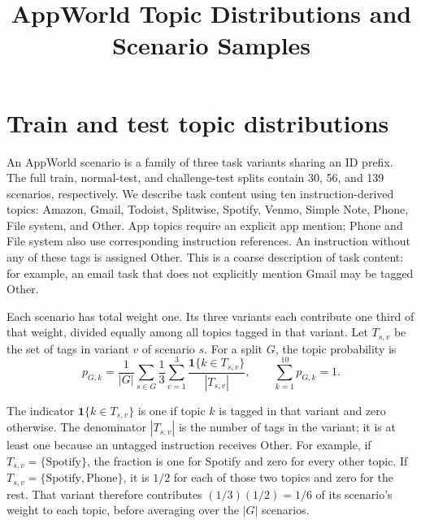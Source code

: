 \documentclass[11pt]{article}
\title{AppWorld Topic Distributions and Scenario Samples}
\author{}
\date{}
\begin{document}
\maketitle

\section{Train and test topic distributions}

An AppWorld scenario is a family of three task variants sharing an ID prefix.
The full train, normal-test, and challenge-test splits contain 30, 56, and 139
scenarios, respectively. We describe task content using ten instruction-derived
topics: Amazon, Gmail, Todoist, Splitwise, Spotify, Venmo, Simple Note, Phone,
File system, and Other. App topics require an explicit app mention; Phone and
File system also use corresponding instruction references. An instruction
without any of these tags is assigned Other. This is a coarse description of
task content: for example, an email task that does not explicitly mention
Gmail may be tagged Other.

Each scenario has total weight one. Its three variants each contribute one
third of that weight, divided equally among all topics tagged in that
variant. Let \(T_{s,v}\) be the set of tags in variant \(v\) of scenario \(s\).
For a split \(G\), the topic probability is
\begin{equation}
  p_{G,k}
  = \frac{1}{|G|}
    \sum_{s\in G}\frac{1}{3}
    \sum_{v=1}^{3}
    \frac{\mathbf{1}\{k\in T_{s,v}\}}{|T_{s,v}|},
  \qquad
  \sum_{k=1}^{10}p_{G,k}=1.
  \label{eq:topic-distribution}
\end{equation}

The indicator \(\mathbf{1}\{k\in T_{s,v}\}\) is one if topic \(k\) is
tagged in that variant and zero otherwise. The denominator
\(|T_{s,v}|\) is the number of tags in the variant; it is at least one
because an untagged instruction receives Other. For example, if
\(T_{s,v}=\{\text{Spotify}\}\), the fraction is one for Spotify and zero
for every other topic. If \(T_{s,v}=\{\text{Spotify},\text{Phone}\}\), it is
\(1/2\) for each of those two topics and zero for the rest. That variant
therefore contributes \((1/3)(1/2)=1/6\) of its scenario's weight to each
topic, before averaging over the \(|G|\) scenarios.
\end{document}
